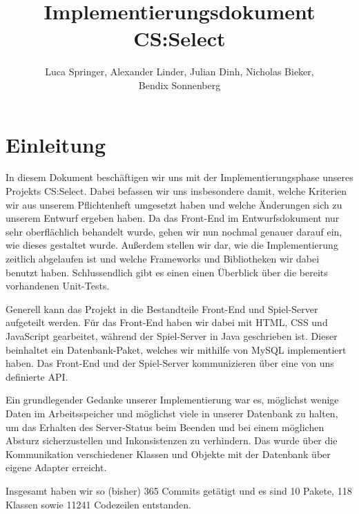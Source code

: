 \documentclass[a4paper]{scrreprt}
\begin{document}
\title{Implementierungsdokument CS:Select}
\author{Luca Springer, Alexander Linder, Julian Dinh, Nicholas Bieker,\\ Bendix Sonnenberg}
\maketitle

\tableofcontents


\chapter{Einleitung}

In diesem Dokument beschäftigen wir uns mit der Implementierungsphase unseres Projekts CS:Select. Dabei befassen wir uns insbesondere damit, welche Kriterien wir aus unserem Pflichtenheft umgesetzt haben und welche Änderungen sich zu unserem Entwurf ergeben haben. Da das Front-End im Entwurfsdokument nur sehr oberflächlich behandelt wurde, gehen wir nun nochmal genauer darauf ein, wie dieses gestaltet wurde. Außerdem stellen wir dar, wie die Implementierung zeitlich abgelaufen ist und welche Frameworks und Bibliotheken wir dabei benutzt haben. Schlussendlich gibt es einen einen Überblick über die bereits vorhandenen Unit-Tests.

\hspace{1cm}

Generell kann das Projekt in die Bestandteile Front-End und Spiel-Server aufgeteilt werden. Für das Front-End haben wir dabei mit HTML, CSS und JavaScript gearbeitet, während der Spiel-Server in Java geschrieben ist. Dieser beinhaltet ein Datenbank-Paket, welches wir mithilfe von MySQL implementiert haben. Das Front-End und der Spiel-Server kommunizieren über eine von uns definierte API.

\hspace{1cm}

Ein grundlegender Gedanke unserer Implementierung war es, möglichst wenige Daten im Arbeitsspeicher und möglichst viele in unserer Datenbank zu halten, um das Erhalten des Server-Status beim Beenden und bei einem möglichen Absturz sicherzustellen und Inkonsistenzen zu verhindern. Das wurde über die Kommunikation verschiedener Klassen und Objekte mit der Datenbank über eigene Adapter erreicht. 

\hspace{1cm}

Insgesamt haben wir so (bisher) 365 Commits getätigt und es sind 10 Pakete, 118 Klassen sowie 11241 Codezeilen entstanden.
\end{document}
